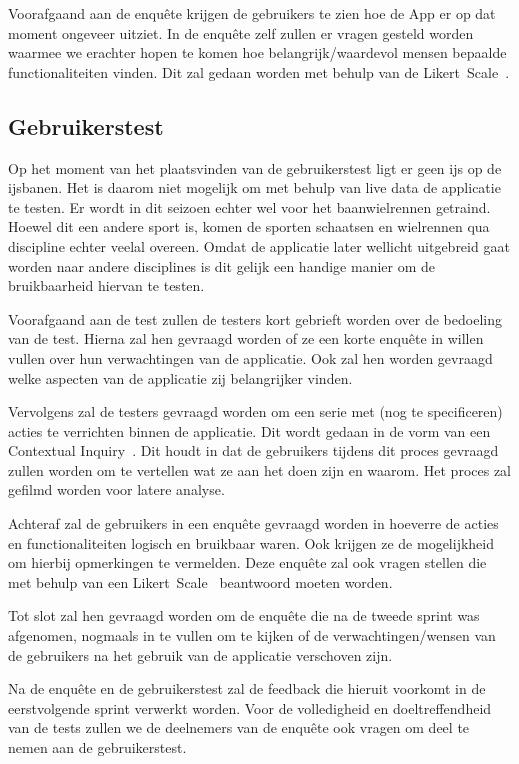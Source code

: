 Voorafgaand aan de enquête krijgen de gebruikers te zien hoe de App er op dat moment ongeveer uitziet. In de enquête zelf zullen er vragen gesteld worden waarmee we erachter hopen te komen hoe belangrijk/waardevol mensen bepaalde functionaliteiten vinden. Dit zal gedaan worden met behulp van de Likert~Scale~\cite{likert1932technique}.

\subsection{Gebruikerstest}
Op het moment van het plaatsvinden van de gebruikerstest ligt er geen ijs op de ijsbanen. Het is daarom niet mogelijk om met behulp van live data de applicatie te testen. Er wordt in dit seizoen echter wel voor het baanwielrennen getraind. Hoewel dit een andere sport is, komen de sporten schaatsen en wielrennen qua discipline echter veelal overeen. Omdat de applicatie later wellicht uitgebreid gaat worden naar andere disciplines is dit gelijk een handige manier om de bruikbaarheid hiervan te testen. 

\bigskip

Voorafgaand aan de test zullen de testers kort gebrieft worden over de bedoeling van de test. Hierna zal hen gevraagd worden of ze een korte enquête in willen vullen over hun verwachtingen van de applicatie. Ook zal hen worden gevraagd welke aspecten van de applicatie zij belangrijker vinden.

Vervolgens zal de testers gevraagd worden om een serie met (nog te specificeren) acties te verrichten binnen de applicatie. Dit wordt gedaan in de vorm van een Contextual Inquiry~\cite{holtzblatt1993contextual}. Dit houdt in dat de gebruikers tijdens dit proces gevraagd zullen worden om te vertellen wat ze aan het doen zijn en waarom. Het proces zal gefilmd worden voor latere analyse.

Achteraf zal de gebruikers in een enquête gevraagd worden in hoeverre de acties en functionaliteiten logisch en bruikbaar waren. Ook krijgen ze de mogelijkheid om hierbij opmerkingen te vermelden. Deze enquête zal ook vragen stellen die met behulp van een Likert~Scale~\cite{likert1932technique} beantwoord moeten worden.

Tot slot zal hen gevraagd worden om de enquête die na de tweede sprint was afgenomen, nogmaals in te vullen om te kijken of de verwachtingen/wensen van de gebruikers na het gebruik van de applicatie verschoven zijn.

Na de enquête en de gebruikerstest zal de feedback die hieruit voorkomt in de eerstvolgende sprint verwerkt worden. Voor de volledigheid en doeltreffendheid van de tests zullen we de deelnemers van de enquête ook vragen om deel te nemen aan de gebruikerstest.
